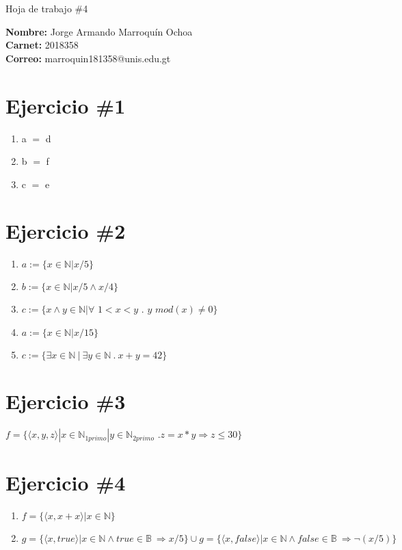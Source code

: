 \documentclass[10pt,letterpaper]{article}
\begin{document}
\begin{center}
        \huge{Hoja de trabajo \#4} \\
\end{center}
\begin{center}
        \textbf{Nombre: }Jorge Armando Marroquín Ochoa\\
        \textbf{Carnet: }2018358\\
        \textbf{Correo: }marroquin181358@unis.edu.gt\\
\end{center}
\section{Ejercicio \#1}
\begin{enumerate}
        \item{a $ = $ d}
        \item{b $ = $ f}
        \item{c $ = $ e}
\end{enumerate}

\section{Ejercicio \#2}
\begin{enumerate}
        \item{$a := \lbrace x \in \mathbb{N} | x/5 \rbrace$}
        \item{$b := \lbrace x \in \mathbb{N} | x/5 \wedge x/4 \rbrace$}
        \item{$c := \{ x \wedge y \in \mathbb{N} |\forall $ $1<x<y$ . $y$ $ mod(x)\neq 0 \}$}
        \item{$a := \lbrace x \in \mathbb{N} | x/15 \rbrace$}
        \item{$c:=\{\exists x\in\mathbb{N}\ |\ \exists y\in\mathbb{N}\ .\ x+y=42 \}$}
        
\end{enumerate}

\section{Ejercicio \#3}
$f=\{\langle x,y,z \rangle|x\in \mathbb{N}_{1primo}|y \in \mathbb{N}_{2primo}$ .$  z=x*y \Rightarrow z \leq 30\}$


\section{Ejercicio \#4}
\begin{enumerate}
        \item{$f=\{\langle x,x + x \rangle|x\in \mathbb{N}\}$}
        \item{$g=\{\langle x, true \rangle|x\in \mathbb{N} \wedge true\in \mathbb{B}\ \Rightarrow x /5\} \cup 
        g=\{\langle x, false \rangle|x\in \mathbb{N} \wedge false\in \mathbb{B}\ \Rightarrow \neg(x /5)\}$ }


\end{enumerate}
\end{document}
